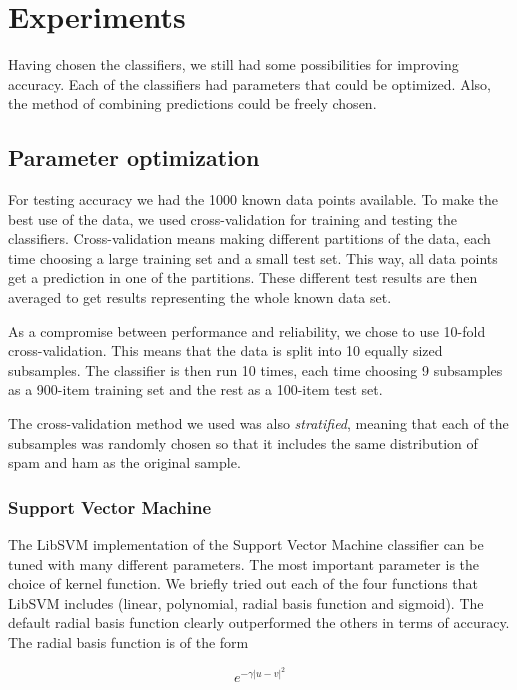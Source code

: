 \section{Experiments}

Having chosen the classifiers, we still had some possibilities for
improving accuracy. Each of the classifiers had parameters that could be
optimized. Also, the method of combining predictions could be freely
chosen.

\subsection{Parameter optimization}

For testing accuracy we had the 1000 known data points available. To
make the best use of the data, we used cross-validation for training and
testing the classifiers. Cross-validation means making different
partitions of the data, each time choosing a large training set and a
small test set. This way, all data points get a prediction in one of the
partitions. These different test results are then averaged to get
results representing the whole known data set.

As a compromise between performance and reliability, we chose to use
10-fold cross-validation. This means that the data is split into 10
equally sized subsamples. The classifier is then run 10 times, each time
choosing 9 subsamples as a 900-item training set and the rest as a
100-item test set.

The cross-validation method we used was also \emph{stratified}, meaning
that each of the subsamples was randomly chosen so that it includes the
same distribution of spam and ham as the original sample.

\subsubsection{Support Vector Machine}

The LibSVM implementation of the Support Vector Machine classifier can
be tuned with many different parameters. The most important parameter is
the choice of kernel function. We briefly tried out each of the four
functions that LibSVM includes (linear, polynomial, radial basis
function and sigmoid). The default radial basis function clearly
outperformed the others in terms of accuracy. The radial basis function
is of the form

\begin{equation}
e^{-\gamma |u-v|^2}
\end{equation}

